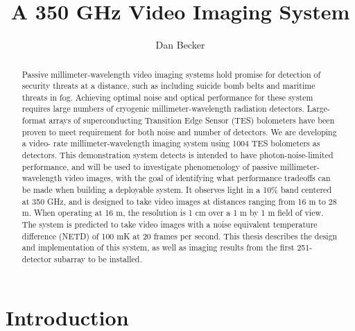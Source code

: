 \documentclass[12pt,letterpaper]{memoir}
\title{A 350 GHz Video Imaging System}
\author{Dan Becker}
\numberwithin{equation}{chapter}
\numberwithin{figure}{chapter}
\numberwithin{table}{chapter}
\begin{document}
\maketitle

\frontmatter

\begin{abstract}
Passive millimeter-wavelength video imaging systems hold promise for detection of security threats at a distance, such as including suicide bomb belts and maritime threats in fog.
Achieving optimal noise and optical performance for these system requires large numbers of cryogenic millimeter-wavelength radiation detectors. Large-format arrays of superconducting Transition Edge Sensor (TES) bolometers have been proven to meet requirement for both noise and number of detectors.
We are developing a video- rate millimeter-wavelength imaging system using 1004 TES bolometers as detectors.
This demonstration system detects is intended to have photon-noise-limited performance, and will be used to investigate phenomenology of passive millimeter-wavelength video images, with the goal of identifying what performance tradeoffs can be made when building a deployable system.
It observes light in a 10\% band centered at 350 GHz, and is designed to take video images at distances ranging from 16 m to 28 m.
When operating at 16 m, the resolution is 1 cm over a 1 m by 1 m field of view.
The system is predicted to take video images with a noise equivalent temperature difference (NETD) of 100 mK at 20 frames per second.
This thesis describes the design and implementation of this system, as well as imaging results from the first 251-detector subarray to be installed.
\end{abstract}

\newpage

\tableofcontents* %

\mainmatter

\chapter{Introduction}\label{c:intro}

\end{document}
